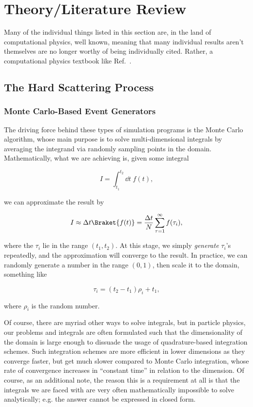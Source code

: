 \section{Theory/Literature Review}\label{sec:Theory-Lit-Review}

Many of the individual things listed in this section are, in the land of computational physics, well known, meaning that many individual results aren't themselves are no longer worthy of being individually cited. Rather, a computational physics textbook like Ref.~\cite{Press_2007}.

\subsection{The Hard Scattering Process}

\subsubsection{Monte Carlo-Based Event Generators}

The driving force behind these types of simulation programs is the Monte Carlo algorithm, whose main purpose is to solve multi-dimensional integrals by averaging the integrand via randomly sampling points in the domain. Mathematically, what we are achieving is, given some integral

\begin{equation}
  I = \int_{t_1}^{t_2} \dd t \; f(t),
\end{equation}

we can approximate the result by

\begin{equation}
  I \approx \Delta t \Braket{f(t)} = \frac{\Delta t}{N} \sum_{\tau=1}^{\infty} f(\tau_i),
\end{equation}

where the $\tau_i$ lie in the range $(t_1,t_2)$. At this stage, we simply \textit{generate} $\tau_i$'s repeatedly, and the approximation will converge to the result. In practice, we can randomly generate a number in the range $(0,1)$, then scale it to the domain, something like

\begin{equation}
  \tau_i = (t_2 - t_1)\rho_i + t_1,
\end{equation}

where $\rho_i$ is the random number.

Of course, there are myriad other ways to solve integrals, but in particle physics, our problems and integrals are often formulated such that the dimensionality of the domain is large enough to dissuade the usage of quadrature-based integration schemes. Such integration schemes are more efficient in lower dimensions as they converge faster, but get much slower compared to Monte Carlo integration, whose rate of convergence increases in ``constant time'' in relation to the dimension. Of course, as an additional note, the reason this is a requirement at all is that the integrals we are faced with are very often mathematically impossible to solve analytically; e.g. the answer cannot be expressed in closed form.

